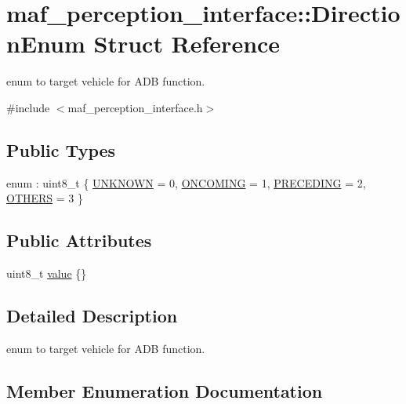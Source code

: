 \hypertarget{structmaf__perception__interface_1_1DirectionEnum}{}\section{maf\+\_\+perception\+\_\+interface\+:\+:Direction\+Enum Struct Reference}
\label{structmaf__perception__interface_1_1DirectionEnum}


enum to target vehicle for A\+DB function.  




{\ttfamily \#include $<$maf\+\_\+perception\+\_\+interface.\+h$>$}

\subsection*{Public Types}
\begin{DoxyCompactItemize}
\item 
enum \+: uint8\+\_\+t \{ \hyperlink{structmaf__perception__interface_1_1DirectionEnum_a25dbe9cdcc1cc6ecd5c89d92ae605f9fa33e6c2aa5e5b1d4b98ea77e819e42a32}{U\+N\+K\+N\+O\+WN} = 0, 
\hyperlink{structmaf__perception__interface_1_1DirectionEnum_a25dbe9cdcc1cc6ecd5c89d92ae605f9fa608ffaa522e7a0719916b673fbf57fb1}{O\+N\+C\+O\+M\+I\+NG} = 1, 
\hyperlink{structmaf__perception__interface_1_1DirectionEnum_a25dbe9cdcc1cc6ecd5c89d92ae605f9faa0a5da800f51a28dcebc8bef7a926f56}{P\+R\+E\+C\+E\+D\+I\+NG} = 2, 
\hyperlink{structmaf__perception__interface_1_1DirectionEnum_a25dbe9cdcc1cc6ecd5c89d92ae605f9fa058af1e088a5b79a45941100ec90e273}{O\+T\+H\+E\+RS} = 3
 \}
\end{DoxyCompactItemize}
\subsection*{Public Attributes}
\begin{DoxyCompactItemize}
\item 
uint8\+\_\+t \hyperlink{structmaf__perception__interface_1_1DirectionEnum_ad22f218874b863d12e913b003626553c}{value} \{\}
\end{DoxyCompactItemize}


\subsection{Detailed Description}
enum to target vehicle for A\+DB function. 

\subsection{Member Enumeration Documentation}
\mbox{\label{structmaf__perception__interface_1_1DirectionEnum_a25dbe9cdcc1cc6ecd5c89d92ae605f9f}} 
